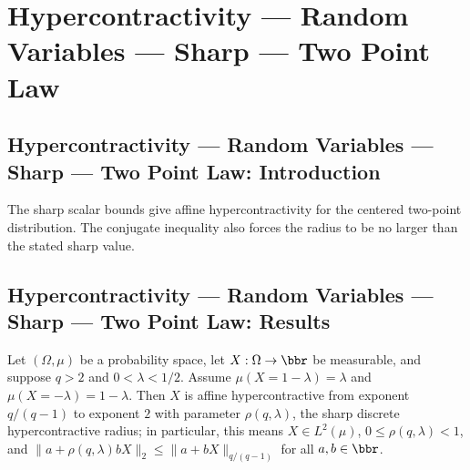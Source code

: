 \section{Hypercontractivity --- Random Variables --- Sharp --- Two Point Law}
\subsection*{Hypercontractivity --- Random Variables --- Sharp --- Two Point Law: Introduction}
The sharp scalar bounds give affine hypercontractivity for the centered two-point distribution. The conjugate inequality also forces the radius to be no larger than the stated sharp value.

\subsection*{Hypercontractivity --- Random Variables --- Sharp --- Two Point Law: Results}

\begin{theorem}
\leanok
{}
Let $(\Omega,\mu)$ be a probability space, let $X:\Omega\to\bbr$ be measurable, and
suppose $q>2$ and $0<\lambda<1/2$. Assume $\mu(X=1-\lambda)=\lambda$ and
$\mu(X=-\lambda)=1-\lambda$. Then $X$ is affine hypercontractive from exponent $q/(q-1)$
to exponent $2$ with parameter $\rho(q,\lambda)$, the sharp discrete hypercontractive
radius; in particular, this means $X\in L^2(\mu)$, $0\le\rho(q,\lambda)<1$, and
$\|a+\rho(q,\lambda)bX\|_2\le\|a+bX\|_{q/(q-1)}$ for all $a,b\in\bbr$.
\end{theorem}

